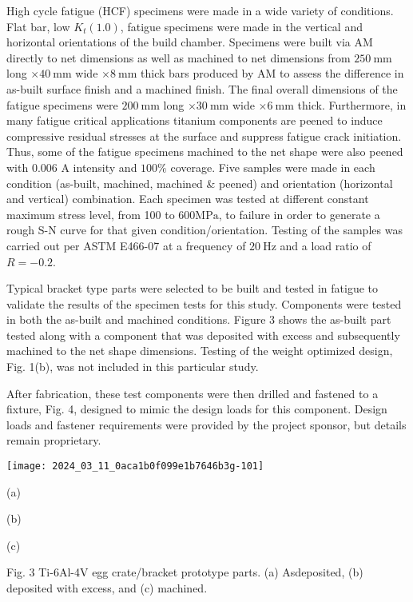 \documentclass[10pt]{article}
\begin{document}
High cycle fatigue (HCF) specimens were made in a wide variety of conditions. Flat bar, low $K_{t}(1.0)$, fatigue specimens were made in the vertical and horizontal orientations of the build chamber. Specimens were built via AM directly to net dimensions as well as machined to net dimensions from $250 \mathrm{~mm}$ long $\times 40 \mathrm{~mm}$ wide $\times 8 \mathrm{~mm}$ thick bars produced by AM to assess the difference in as-built surface finish and a machined finish. The final overall dimensions of the fatigue specimens were $200 \mathrm{~mm}$ long $\times 30 \mathrm{~mm}$ wide $\times 6 \mathrm{~mm}$ thick. Furthermore, in many fatigue critical applications titanium components are peened to induce compressive residual stresses at the surface and suppress fatigue crack initiation. Thus, some of the fatigue specimens machined to the net shape were also peened with 0.006 A intensity and $100 \%$ coverage. Five samples were made in each condition (as-built, machined, machined \& peened) and orientation (horizontal and vertical) combination. Each specimen was tested at different constant maximum stress level, from 100 to $600 \mathrm{MPa}$, to failure in order to generate a rough S-N curve for that given condition/orientation. Testing of the samples was carried out per ASTM E466-07 at a frequency of $20 \mathrm{~Hz}$ and a load ratio of $R=-0.2$.

Typical bracket type parts were selected to be built and tested in fatigue to validate the results of the specimen tests for this study. Components were tested in both the as-built and machined conditions. Figure 3 shows the as-built part tested along with a component that was deposited with excess and subsequently machined to the net shape dimensions. Testing of the weight optimized design, Fig. 1(b), was not included in this particular study.

After fabrication, these test components were then drilled and fastened to a fixture, Fig. 4, designed to mimic the design loads for this component. Design loads and fastener requirements were provided by the project sponsor, but details remain proprietary.

\begin{center}
\texttt{[image: 2024\_03\_11\_0aca1b0f099e1b7646b3g-101]}
\end{center}

(a)

(b)

(c)

Fig. 3 Ti-6Al-4V egg crate/bracket prototype parts. (a) Asdeposited, (b) deposited with excess, and (c) machined.
\end{document}

